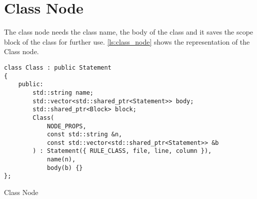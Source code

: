\section{Class Node}

The class node needs the class name, the body of the class and it saves the scope block of the class for further use.
\autoref{ls:class_node} shows the representation of the Class node.

\begin{listing}[H]
\begin{verbatim}
class Class : public Statement
{
    public:
        std::string name;
        std::vector<std::shared_ptr<Statement>> body;
        std::shared_ptr<Block> block;
        Class(
            NODE_PROPS,
            const std::string &n,
            const std::vector<std::shared_ptr<Statement>> &b
        ) : Statement({ RULE_CLASS, file, line, column }),
            name(n),
            body(b) {}
};
\end{verbatim}
\caption{Class Node}
\label{ls:class_node}
\end{listing}
